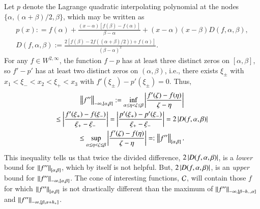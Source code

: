 \documentclass[review]{elsarticle}
\theoremstyle{definition}
\renewcommand{\cw}{W}
\begin{document}
Let $p$ denote the Lagrange quadratic interpolating polynomial at the nodes
$\{\alpha, (\alpha + \beta)/2, \beta\}$, which may be written as
\begin{gather}
\nonumber
p(x) : = f(\alpha) + \frac{(x-\alpha)[f(\beta) - f(\alpha)]}{\beta - \alpha}  + (x-\alpha)(x-\beta) D(f,\alpha,\beta), \\
D(f,\alpha,\beta) := \frac{2[f(\beta) - 2f((\alpha + \beta)/2)) + f(\alpha)]}{(\beta - \alpha)^2}. \label{divdiffdef}
\end{gather}
For any $f \in \cw^{2,\infty}$, the function $f - p$ has at least three distinct
zeros on $[\alpha,\beta]$, so $f' - p'$ has at least two distinct zeros on $(\alpha,\beta)$, i.e., there exists $\xi_\pm$ with $x_1 < \xi_- < x_2 < \xi_+ < x_3$ with
$f'(\xi_\pm) - p'(\xi_{\pm}) = 0$.   Thus,
\begin{multline} \label{NDDbdm}
\norm[-\infty,{[\alpha,\beta]}]{f''} := \inf_{\alpha \le \eta < \zeta \le \beta} \abs{\frac{f'(\zeta) - f(\eta)}{\zeta - \eta}} \\
\le \abs{\frac{f'(\xi_+) - f(\xi_-)}{\xi_+ - \xi_-}} 
 = \abs{\frac{p'(\xi_+) - p'(\xi_-)}{\xi_+ - \xi_-}} = 2 \abs{D(f,\alpha,\beta)} \\
 \le \sup_{\alpha \le \eta < \zeta \le \beta} \abs{\frac{f'(\zeta) - f(\eta)}{\zeta - \eta}} =: \norm[{[\alpha,\beta]}]{f''}.
\end{multline}
This inequality tells us that twice the divided difference, $2\abs{D(f,\alpha,\beta)}$, is a \emph{lower} bound for $\norm[{[\alpha,\beta]}]{f''}$, which by itself is not helpful.  But, $2\abs{D(f,\alpha,\beta)}$, is an \emph{upper} bound for $\norm[-\infty,{[\alpha,\beta]}]{f''}$.  The cone of interesting functions, $\cc$, will contain those $f$ for which $\norm[{[\alpha,\beta]}]{f''}$ is not drastically different than the maximum of $\norm[-\infty,{[\beta -  h_-, \alpha]}]{f''}$ and $\norm[-\infty,{[\beta, \alpha+ h_+]}]{f''}$.
\end{document}
